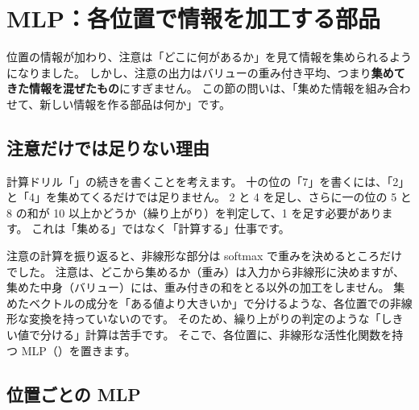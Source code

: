 \section{MLP：各位置で情報を加工する部品}\label{sec:tf-mlp}

位置の情報が加わり、注意は「どこに何があるか」を見て情報を集められるようになりました。
しかし、注意の出力はバリューの重み付き平均、つまり\textbf{集めてきた情報を混ぜたもの}にすぎません。
この節の問いは、「集めた情報を組み合わせて、新しい情報を作る部品は何か」です。

\subsection*{注意だけでは足りない理由}

計算ドリル「」の続きを書くことを考えます。
十の位の「7」を書くには、「2」と「4」を集めてくるだけでは足りません。
2 と 4 を足し、さらに一の位の 5 と 8 の和が 10 以上かどうか（繰り上がり）を判定して、1 を足す必要があります。
これは「集める」ではなく「計算する」仕事です。

注意の計算を振り返ると、非線形な部分は softmax で重みを決めるところだけでした。
注意は、どこから集めるか（重み）は入力から非線形に決めますが、集めた中身（バリュー）には、重み付きの和をとる以外の加工をしません。
集めたベクトルの成分を「ある値より大きいか」で分けるような、各位置での非線形な変換を持っていないのです。
そのため、繰り上がりの判定のような「しきい値で分ける」計算は苦手です。
そこで、各位置に、非線形な活性化関数を持つ MLP（）を置きます。

\subsection*{位置ごとの MLP}

